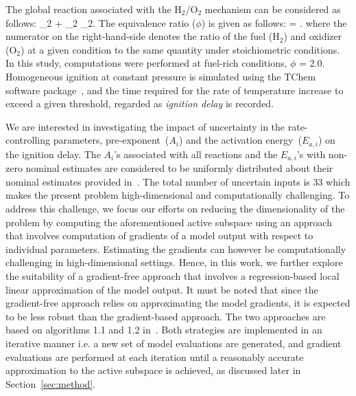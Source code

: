 The global reaction associated with the H$_2$/O$_2$ mechanism can
be considered as follows:
_2 + _2 _2.
\label{eq:global}
\ee 
The equivalence ratio ($\phi$) is given as follows:
%
\be
\phi = .
\label{eq:phi}
\ee
%
where the numerator on the right-hand-side denotes the ratio of the fuel (H$_2$)
and oxidizer (O$_2$) at a given condition to the same quantity under stoichiometric
conditions. In this study, computations were performed at fuel-rich conditions,
$\phi$ = 2.0. Homogeneous ignition at constant pressure is simulated using the
TChem software package~\cite{Safta:2011}, and the time required for the rate of
temperature increase to exceed a given threshold, regarded as \emph{ignition delay}
is recorded. 

We are interested in investigating the impact of uncertainty in the
rate-controlling parameters, pre-exponent~($A_i$) and the activation
energy~($E_{a,i}$) on the ignition delay. The $A_i$'s associated with all
reactions and the $E_{a,i}$'s with non-zero nominal estimates
are considered to be uniformly distributed about their nominal estimates provided
in~\cite{Yetter:1991}.  The total number of uncertain inputs is 33 which makes
the present problem high-dimensional and computationally challenging. 
To address this challenge, we focus our efforts on reducing the dimensionality
of the problem by computing the aforementioned active subspace using
an approach that involves computation of gradients of a model output with
respect to individual parameters. Estimating the
gradients can however be computationally challenging in high-dimensional settings. 
Hence, in this work, we further explore the suitability of a gradient-free
approach that involves a regression-based local linear approximation of
the model output. It must be noted that since the gradient-free approach
relies on approximating the model gradients, it is expected to be less
robust than the gradient-based approach. The two approaches are based on
algorithms 1.1 and 1.2 in~\cite{Constantine:2015}. Both strategies
are implemented in an iterative manner i.e. a new set of model evaluations are
generated, and gradient evaluations are performed at each iteration until 
a reasonably accurate approximation to the active subspace is achieved, as
discussed later in Section~\ref{sec:method}. 

